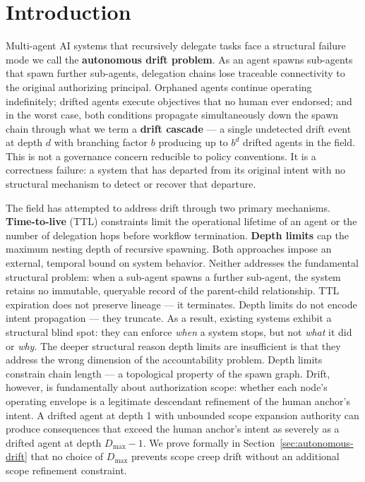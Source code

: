 \section{Introduction}

Multi-agent AI systems that recursively delegate tasks face a structural failure mode we call the \textbf{autonomous drift problem}. As an agent spawns sub-agents that spawn further sub-agents, delegation chains lose traceable connectivity to the original authorizing principal. Orphaned agents continue operating indefinitely; drifted agents execute objectives that no human ever endorsed; and in the worst case, both conditions propagate simultaneously down the spawn chain through what we term a \textbf{drift cascade} — a single undetected drift event at depth $d$ with branching factor $b$ producing up to $b^d$ drifted agents in the field. This is not a governance concern reducible to policy conventions. It is a correctness failure: a system that has departed from its original intent with no structural mechanism to detect or recover that departure.

The field has attempted to address drift through two primary mechanisms. \textbf{Time-to-live} (TTL) constraints limit the operational lifetime of an agent or the number of delegation hops before workflow termination. \textbf{Depth limits} cap the maximum nesting depth of recursive spawning. Both approaches impose an external, temporal bound on system behavior. Neither addresses the fundamental structural problem: when a sub-agent spawns a further sub-agent, the system retains no immutable, queryable record of the parent-child relationship. TTL expiration does not preserve lineage — it terminates. Depth limits do not encode intent propagation — they truncate. As a result, existing systems exhibit a structural blind spot: they can enforce \emph{when} a system stops, but not \emph{what} it did or \emph{why}. The deeper structural reason depth limits are insufficient is that they address the wrong dimension of the accountability problem. Depth limits constrain chain length — a topological property of the spawn graph. Drift, however, is fundamentally about authorization scope: whether each node's operating envelope is a legitimate descendant refinement of the human anchor's intent. A drifted agent at depth 1 with unbounded scope expansion authority can produce consequences that exceed the human anchor's intent as severely as a drifted agent at depth $D_{\max} - 1$. We prove formally in Section~\ref{sec:autonomous-drift} that no choice of $D_{\max}$ prevents scope creep drift without an additional scope refinement constraint.


